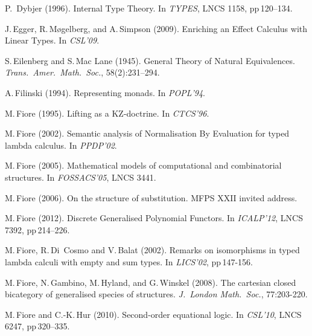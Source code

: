 \documentclass[11pt,twocolumn]{article}
\begin{document}
{\begin{thebibliography}{000}
P.~Dybjer (1996).
\newblock Internal Type Theory.
\newblock In \emph{TYPES}, LNCS 1158, pp\,120--134.


J.\,Egger, R.\,M{\o}gelberg, and A.\,Simpson (2009). 
\newblock Enriching an Effect Calculus with Linear Types. 
\newblock In \emph{CSL'09}.

S.\,Eilenberg and S.\,Mac Lane (1945).
\newblock General Theory of Natural Equivalences.
\newblock \emph{Trans.\ Amer.\ Math.\ Soc.},
  58(2):231--294. 

A.\,Filinski (1994).
\newblock Representing monads.
\newblock In \emph{POPL'94}.

M.\,Fiore (1995).  
\newblock Lifting as a KZ-doctrine.  
\newblock In \emph{CTCS'96}.

M.\,Fiore (2002). 
\newblock Semantic analysis of Normalisation By Evaluation for typed
lambda calculus.  
\newblock In \emph{PPDP'02}.

M.\,Fiore (2005).  
\newblock Mathematical models of computational and combinatorial
structures.  
\newblock In \emph{FOSSACS'05}, LNCS 3441. 

M.\,Fiore (2006).
\newblock On the structure of substitution.  
\newblock MFPS XXII invited address. 

M.\,Fiore (2012).   
\newblock Discrete Generalised Polynomial Functors.  
\newblock In \emph{ICALP'12}, LNCS 7392, pp\,214--226.

M.\,Fiore, R.\,Di~Cosmo and V.\,Balat (2002). 
\newblock Remarks on isomorphisms in typed lambda calculi with empty and
sum types.  
\newblock In \emph{LICS'02}, pp\,147-156.  

M.\,Fiore, N.\,Gambino, M.\,Hyland, and G.\,Winskel (2008).   
\newblock The cartesian closed bicategory of generalised species of
structures.
\newblock \emph{J.\ London Math.\ Soc.}, 77:203-220. 

M.\,Fiore and C.-K.\,Hur (2010).   
\newblock Second-order equational logic.  
\newblock In \emph{CSL'10}, LNCS 6247, pp\,320--335. 
  

\end{thebibliography}}
\end{document}
